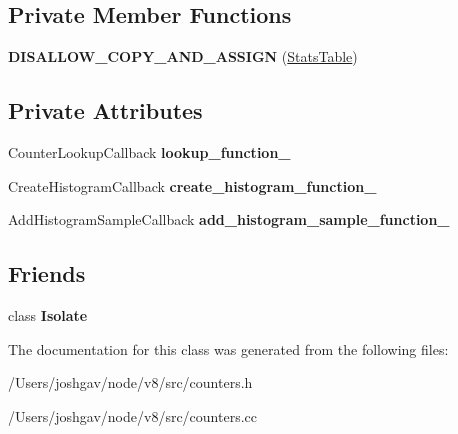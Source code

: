 \subsection*{Private Member Functions}
\begin{DoxyCompactItemize}
\item 
{\bfseries D\+I\+S\+A\+L\+L\+O\+W\+\_\+\+C\+O\+P\+Y\+\_\+\+A\+N\+D\+\_\+\+A\+S\+S\+I\+GN} (\hyperlink{classv8_1_1internal_1_1_stats_table}{Stats\+Table})\hypertarget{classv8_1_1internal_1_1_stats_table_aa880096ea2d510073d0e1d78152e4d7f}{}\label{classv8_1_1internal_1_1_stats_table_aa880096ea2d510073d0e1d78152e4d7f}

\end{DoxyCompactItemize}
\subsection*{Private Attributes}
\begin{DoxyCompactItemize}
\item 
Counter\+Lookup\+Callback {\bfseries lookup\+\_\+function\+\_\+}\hypertarget{classv8_1_1internal_1_1_stats_table_a13be5f91e743868d560ce41faf979674}{}\label{classv8_1_1internal_1_1_stats_table_a13be5f91e743868d560ce41faf979674}

\item 
Create\+Histogram\+Callback {\bfseries create\+\_\+histogram\+\_\+function\+\_\+}\hypertarget{classv8_1_1internal_1_1_stats_table_a52585751e34ca9670ca7ea8d32a909f8}{}\label{classv8_1_1internal_1_1_stats_table_a52585751e34ca9670ca7ea8d32a909f8}

\item 
Add\+Histogram\+Sample\+Callback {\bfseries add\+\_\+histogram\+\_\+sample\+\_\+function\+\_\+}\hypertarget{classv8_1_1internal_1_1_stats_table_a7c1a1dceb191619fa401cf3933ac4c25}{}\label{classv8_1_1internal_1_1_stats_table_a7c1a1dceb191619fa401cf3933ac4c25}

\end{DoxyCompactItemize}
\subsection*{Friends}
\begin{DoxyCompactItemize}
\item 
class {\bfseries Isolate}\hypertarget{classv8_1_1internal_1_1_stats_table_aba4f0964bdacf2bbf62cf876e5d28d0a}{}\label{classv8_1_1internal_1_1_stats_table_aba4f0964bdacf2bbf62cf876e5d28d0a}

\end{DoxyCompactItemize}


The documentation for this class was generated from the following files\+:\begin{DoxyCompactItemize}
\item 
/\+Users/joshgav/node/v8/src/counters.\+h\item 
/\+Users/joshgav/node/v8/src/counters.\+cc\end{DoxyCompactItemize}
